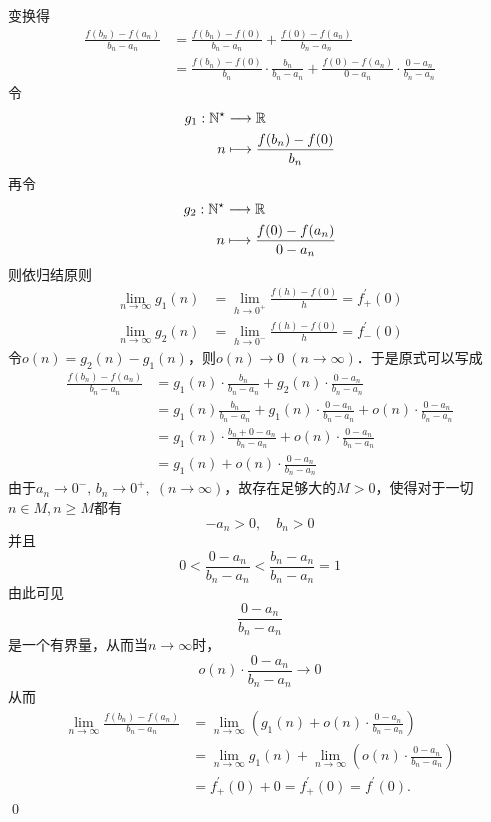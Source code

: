 \prove 变换得
\begin{align}
    \frac{f(b_n)-f(a_n)}{b_n-a_n} &= \frac{f(b_n)-f(0)}{b_n-a_n}+\frac{f(0)-f(a_n)}{b_n-a_n} \\
    &= \frac{f(b_n)-f(0)}{b_n} \cdot \frac{b_n}{b_n - a_n} + \frac{f(0)-f(a_n)}{0 - a_n} \cdot \frac{0 - a_n}{b_n - a_n}
\end{align}
令
\begin{align}
    g_1 : \mathbb{N}^\star &\longrightarrow \mathbb{R} \\
    n &\longmapsto \frac{f(b_n)-f(0)}{b_n}
\end{align}
再令
\begin{align}
    g_2 : \mathbb{N}^\star &\longrightarrow \mathbb{R} \\
    n &\longmapsto \frac{f(0)-f(a_n)}{0-a_n}
\end{align}
则依归结原则
\begin{align}
    \lim_{n \to \infty} g_1(n) &= \lim_{h \to 0^+} \frac{f(h)-f(0)}{h} = f^{\prime}_+(0) \\
    \lim_{n \to \infty} g_2(n) &= \lim_{h \to 0^-} \frac{f(h)-f(0)}{h} = f^{\prime}_-(0)
\end{align}
令$o(n) = g_2(n)-g_1(n)$，则$o(n) \to 0 \; (n \to \infty)$．于是原式可以写成
\begin{align}
    \frac{f(b_n)-f(a_n)}{b_n - a_n} &= g_1(n) \cdot \frac{b_n}{b_n-a_n} + g_2(n) \cdot \frac{0-a_n}{b_n-a_n} \\
    &= g_1(n) \frac{b_n}{b_n-a_n} + g_1(n) \cdot \frac{0-a_n}{b_n-a_n} + o(n) \cdot \frac{0-a_n}{b_n-a_n} \\
    &=g_1(n) \cdot \frac{b_n + 0 - a_n}{b_n - a_n} + o(n) \cdot \frac{0 - a_n}{b_n - a_n} \\
    &= g_1(n) + o(n) \cdot \frac{0-a_n}{b_n - a_n}
\end{align}
由于$a_n \to 0^-, \, b_n \to 0^+, \; (n \to \infty)$，故存在足够大的$M > 0$，使得对于一切$n \in M, n \geq M$都有
\begin{equation}
    -a_n > 0, \quad b_n > 0
\end{equation}
并且
\begin{equation}
    0 < \frac{0 - a_n}{b_n - a_n} < \frac{b_n - a_n}{b_n - a_n} = 1
\end{equation}
由此可见
\begin{equation}
    \frac{0-a_n}{b_n - a_n}
\end{equation}
是一个有界量，从而当$n \to \infty$时，
\begin{equation}
    o(n) \cdot \frac{0 - a_n}{b_n - a_n} \to 0
\end{equation}
从而
\begin{align}
    \lim_{n \to \infty} \frac{f(b_n)-f(a_n)}{b_n-a_n} &= \lim_{n \to \infty} \left( g_1(n) + o(n) \cdot \frac{0 - a_n}{b_n-a_n}\right) \\
    &= \lim_{n \to \infty} g_1(n) + \lim_{n \to \infty} \left( o(n) \cdot \frac{0 - a_n}{b_n - a_n} \right) \\
    &= f^{\prime}_{+}(0) + 0 = f^{\prime}_{+}(0) = f^{\prime}(0).
\end{align}
\qed\bigskip